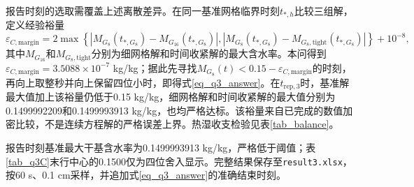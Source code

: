 报告时刻的选取需覆盖上述离散差异。在同一基准网格临界时刻$t_{*,h}$比较三组解，定义经验裕量
\begin{equation}\label{eq_margin}
\varepsilon_{C,\mathrm{margin}}=2\max\left\{|M_{G_8}(t_{*,G_8})-M_{G_{16}}(t_{*,G_8})|,
|M_{G_8}(t_{*,G_8})-M_{G_8,\mathrm{tight}}(t_{*,G_8})|\right\}+10^{-8},
\end{equation}
其中$M_{G_{16}}$和$M_{G_8,\mathrm{tight}}$分别为细网格解和时间收紧解的最大含水率。本问得到$\varepsilon_{C,\mathrm{margin}}=3.5088\times10^{-7}$ kg/kg；据此先寻找$M_{G_8}(t)<0.15-\varepsilon_{C,\mathrm{margin}}$的时刻，再向上取整秒并向上保留四位小时，即得式\eqref{eq_q3_answer}。在$t_{\mathrm{rep},3}$时，基准解最大值加上该裕量仍低于0.15 kg/kg，细网格解和时间收紧解的最大值分别为0.1499992209和0.1499993913 kg/kg，也均严格达标。该裕量来自已完成的数值加密比较，不是连续方程解的严格误差上界。热湿收支检验见表\ref{tab_balance}。

报告时刻基准最大干基含水率为0.1499993913 kg/kg，严格低于阈值；表\ref{tab_q3C}末行中心的0.1500仅为四位舍入显示。完整结果保存至\texttt{result3.xlsx}，按60 s、0.1 cm采样，并追加式\eqref{eq_q3_answer}的准确结束时刻。
\FloatBarrier


